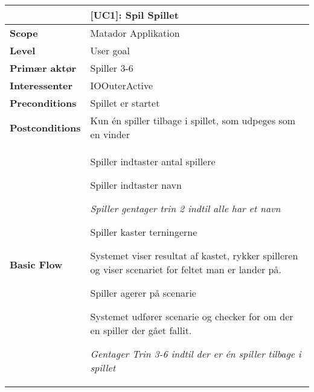 \documentclass[class=article, crop=false]{standalone}
\makeatletter
\let\savespace\@minipagetrue
\makeatother
\begin{document}
    \begin{table}[H]
        \begin{tabularx}{\textwidth}{|l|X|}
            \hline
                                         & \textbf{[UC1]: Spil Spillet}   \\ \hline
            \textbf{Scope}               & Matador Applikation\\ \hline
            \textbf{Level}               & User goal     \\ \hline
            \textbf{Primær aktør}        & Spiller 3-6   \\ \hline
            \textbf{Interessenter}       & IOOuterActive\\ \hline
            \textbf{Preconditions}       & Spillet er startet \\ \hline
            \textbf{Postconditions}      & Kun én spiller tilbage i spillet,
                                           som udpeges som en vinder\\ \hline
            \textbf{Basic Flow} & \begin{tabenum}
                                  \item Spiller indtaster antal spillere
                                  \item Spiller indtaster navn
                                      \savespace
                                        \begin{compactitem}
                                            \item \textit{Spiller gentager trin 2                                                             indtil alle har et navn}
                                  \end{compactitem}
                                      \item Spiller kaster terningerne
                                      \item Systemet viser resultat af kastet, rykker spilleren og viser scenariet for feltet man er lander på.
                                      \item Spiller agerer på scenarie
                                      \item Systemet udfører scenarie og checker for om der en spiller der gået fallit.
                                  \savespace
                                  \begin{compactitem}
                                      \item \textit{Gentager Trin 3-6 indtil der er én spiller tilbage i spillet}

\end{compactitem}
\end{tabenum}
\end{tabularx}
\end{table}
\end{document}
